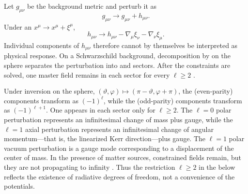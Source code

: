 Let $g_{\mu\nu}$ be the background metric and perturb it as
\begin{equation}
g_{\mu\nu}
\longrightarrow
g_{\mu\nu}+h_{\mu\nu}.
\end{equation}
Under an  $x^\mu\to x^\mu+\xi^\mu$,
\begin{equation}
h_{\mu\nu}
\longrightarrow
h_{\mu\nu}
-\nabla_\mu\xi_\nu
-\nabla_\nu\xi_\mu.
\label{eq:linear-gauge-transformation}
\end{equation}
Individual components of $h_{\mu\nu}$ therefore cannot by themselves be interpreted as physical response. On a Schwarzschild background, decomposition by  on the sphere separates the perturbation into  and  sectors. After the constraints are solved, one  master field remains in each sector for every $\ell\geq2$ \cite{Regge:1957td,Zerilli:1970wzz,Moncrief:1974am}.

Under inversion on the sphere, $(\vartheta,\varphi)\mapsto(\pi-\vartheta,\varphi+\pi)$, the  (even-parity) components transform as $(-1)^\ell$, while the  (odd-parity) components transform as $(-1)^{\ell+1}$. One  appears in each sector only for $\ell\geq2$. The $\ell=0$ polar perturbation represents an infinitesimal change of mass plus gauge, while the $\ell=1$ axial perturbation represents an infinitesimal change of angular momentum---that is, the linearized Kerr direction---plus gauge. The $\ell=1$ polar vacuum perturbation is a gauge mode corresponding to a displacement of the center of mass. In the presence of matter sources, constrained  fields remain, but they are not  propagating to infinity \cite{Martel:2005ir}. Thus the restriction $\ell\geq2$ in the  below reflects the existence of radiative degrees of freedom, not a convenience of the potentials.

